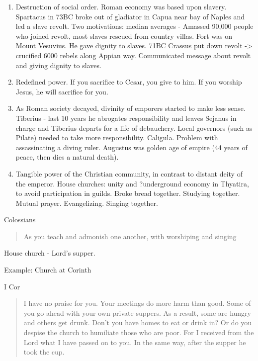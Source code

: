 \documentclass[
]{book}
\begin{document}
\begin{enumerate}
\def\labelenumi{\arabic{enumi})}
\item
  Destruction of social order. Roman economy was based upon slavery. Spartacus in 73BC broke out of gladiator in Capua near bay of Naples and led a slave revolt. Two motivations: median averages - Amassed 90,000 people who joined revolt, most slaves rescued from country villas. Fort was on Mount Vesuvius. He gave dignity to slaves. 71BC Crassus put down revolt -\textgreater{} crucified 6000 rebels along Appian way. Communicated message about revolt and giving dignity to slaves.
\item
  Redefined power. If you sacrifice to Cesar, you give to him. If you worship Jesus, he will sacrifice for you.
\item
  As Roman society decayed, divinity of emporers started to make less sense. Tiberius - last 10 years he abrogates responsibility and leaves Sejanus in charge and Tiberius departs for a life of debauchery. Local governors (such as Pilate) needed to take more responsibility. Caligula. Problem with assassinating a diving ruler. Augustus was golden age of empire (44 years of peace, then dies a natural death).
\item
  Tangible power of the Christian community, in contrast to distant deity of the emperor. House churches: unity and ?underground economy in Thyatira, to avoid participation in guilds. Broke bread together. Studying together. Mutual prayer. Evangelizing. Singing together.
\end{enumerate}

Colossians

\begin{quote}
As you teach and admonish one another, with worshiping and singing
\end{quote}

House church - Lord's supper.

Example: Church at Corinth

I Cor

\begin{quote}
I have no praise for you. Your meetings do more harm than good. Some of you go ahead with your own private suppers. As a result, some are hungry and others get drunk. Don't you have homes to eat or drink in? Or do you despise the church to humiliate those who are poor. For I received from the Lord what I have passed on to you. In the same way, after the supper he took the cup.
\end{quote}
\end{document}
